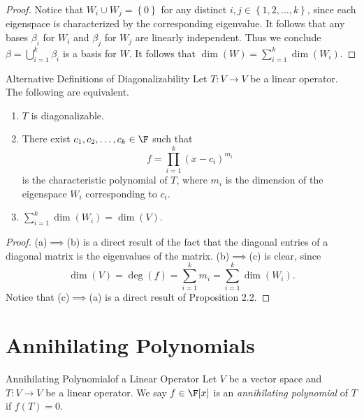 \documentclass[linearalgebraII]{subfiles}
\begin{document}
    \begin{proof}
        Notice that $W_i\cup W_j = \left\lbrace 0 \right\rbrace$ for any distinct $i,j\in \left\lbrace 1, 2, \ldots, k \right\rbrace$, since each eigenspace is characterized by the corresponding eigenvalue. It follows that any bases $\beta_i$ for $W_i$ and $\beta_j$ for $W_j$ are linearly independent. Thus we conclude $\beta=\bigcup^{k}_{i=1} \beta_i$ is a basis for $W$. It follows that $\dim \left( W \right) = \sum^{k}_{i=1} \dim(W_i)$. 
    \end{proof}

    \begin{prop}{Alternative Definitions of Diagonalizability}
        Let $T:V\to V$ be a linear operator. The following are equivalent.
        \begin{enumerate}
            \item $T$ is diagonalizable.
            \item There exist $c_1, c_2, \ldots, c_k\in \F$ such that
                \begin{equation*}
                    f = \prod^{k}_{i=1} (x-c_i)^{m_i}
                \end{equation*}
                is the characteristic polynomial of $T$, where $m_i$ is the dimension of the eigenspace $W_i$ corresponding to $c_i$.
            \item $\sum^{k}_{i=1} \dim(W_i) = \dim(V)$.
        \end{enumerate}
    \end{prop}

    \begin{proof}
        (a)$\implies$(b) is a direct result of the fact that the diagonal entries of a diagonal matrix is the eigenvalues of the matrix. (b)$\implies$(c) is clear, since
        \begin{equation*}
            \dim(V) = \deg(f) = \sum^{k}_{i=1} m_i = \sum^{k}_{i=1} \dim(W_i).  
        \end{equation*}
        Notice that (c)$\implies$(a) is a direct result of Proposition 2.2. 
    \end{proof}

    \section{Annihilating Polynomials}

    \begin{definition}{Annihilating Polynomial}{of a Linear Operator}
        Let $V$ be a vector space and $T:V\to V$ be a linear operator. We say $f\in\F[x]$ is an \emph{annihilating polynomial} of $T$ if $f(T)=0$.
    \end{definition}
\end{document}
